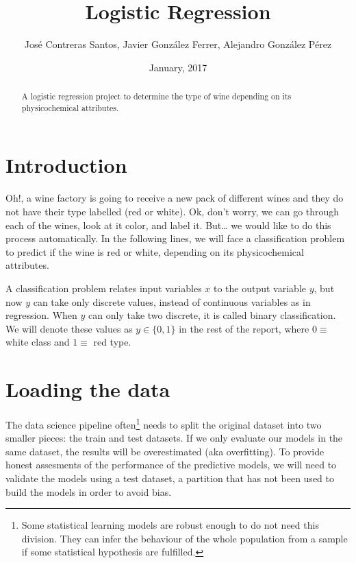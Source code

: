 \documentclass[12pt,]{article}
\title{Logistic Regression}
\author{José Contreras Santos, Javier González Ferrer, Alejandro González Pérez}
\date{January, 2017}
\let\rmarkdownfootnote\footnote%
\def\footnote{\protect\rmarkdownfootnote}
\begin{document}
\maketitle
\begin{abstract}
A logistic regression project to determine the type of wine depending on
its physicochemical attributes.
\end{abstract}

\section{Introduction}\label{introduction}

Oh!, a wine factory is going to receive a new pack of different wines
and they do not have their type labelled (red or white). Ok, don't
worry, we can go through each of the wines, look at it color, and label
it. But\ldots{} we would like to do this process automatically. In the
following lines, we will face a classification problem to predict if the
wine is red or white, depending on its physicochemical attributes.

A classification problem relates input variables \(x\) to the output
variable \(y\), but now \(y\) can take only discrete values, instead of
continuous variables as in regression. When \(y\) can only take two
discrete, it is called binary classification. We will denote these
values as \(y \in \{0, 1\}\) in the rest of the report, where
\(0 \equiv\) white class and \(1 \equiv\) red type.

\section{Loading the data}\label{loading-the-data}

The data science pipeline often\footnote{Some statistical learning
  models are robust enough to do not need this division. They can infer
  the behaviour of the whole population from a sample if some
  statistical hypothesis are fulfilled.} needs to split the original
dataset into two smaller pieces: the train and test datasets. If we only
evaluate our models in the same dataset, the results will be
overestimated (aka overfitting). To provide honest assesments of the
performance of the predictive models, we will need to validate the
models using a test dataset, a partition that has not been used to build
the models in order to avoid bias.
\end{document}
